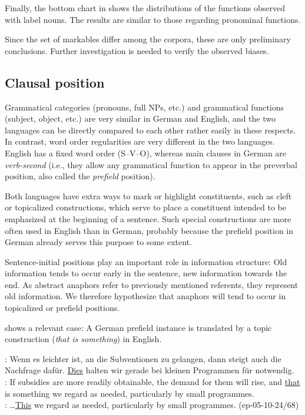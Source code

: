 \documentclass[output=paper]{LSP/langsci}
\begin{document}
\newpage 
Finally,  the bottom chart in  shows the distributions of the functions observed with label nouns. The results are  similar to those regarding  pronominal functions.

Since the set of markables differ among the corpora, these are only preliminary conclusions. Further investigation is needed to verify the observed biases.


\subsection{Clausal position}
\label{sec:pos}

Grammatical categories (pronouns, full NPs, etc.) and grammatical functions (subject, object, etc.) are very similar in German and English, and the two languages can be directly compared to each other rather easily in these respects. In contrast, word order regularities are very different in the two languages. English has a fixed word order (S--V--O), whereas main clauses in German are \emph{verb-second} (i.e., they allow any grammatical function to appear in the preverbal position, also called the \emph{prefield} position). 

Both languages have extra ways to mark or highlight constituents, such as cleft or topicalized constructions, which serve to place a constituent intended  to be emphasized at the beginning of a sentence. Such special constructions are more often used in English than in German, probably because the prefield position in German already serves  this purpose to some extent.

Sentence-initial positions play an important role in information structure: Old information tends to occur early in the sentence, new information towards the end. As abstract anaphors refer to previously mentioned referents, they represent old information. We therefore hypothesize that anaphors will tend to occur in topicalized or prefield positions.

 shows a relevant case: A German prefield instance is translated by a topic construction (\textit{that is something}) in English.

\ea \label{ex:vorfeld2} %
\DEo: Wenn es leichter ist, an die Subventionen zu gelangen, dann steigt auch die Nachfrage daf\"ur. \ul{Dies} halten wir gerade bei kleinen Programmen f\"ur notwendig.\\
\ENt : If subsidies are more readily obtainable, the demand for them will rise, and \ul{that} is something we regard as needed, particularly by small programmes. \\
\DElit : \dots \ul{This} we regard as needed, particularly by small programmes. \hfill{(ep-05-10-24/68)}
\z
\end{document}
